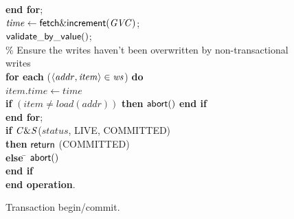\documentclass[11pt,letterpaper]{article}
\begin{document}
\begin{figure} [htb]
{{\begin{minipage}[t]{150mm}
\begin{tabbing}
 \> {\bf end for}; \\

 \> $\mathit{time} \gets {\sf fetch\&increment}(\mathit{GVC})$; \\

 \> ${\sf validate\_by\_value}()$;  \\


\> \% Ensure the writes haven't been overwritten by non-transactional writes \\
 \> 
{\bf for each} ($\left \langle \mathit{addr, item} \right \rangle  \in \mathit{ws}$) {\bf do} \\
 \>\> $\mathit{item.time} \gets \mathit{time}$ \\
 \>\> {\bf if} $(\mathit{item} \neq load(\mathit{addr}))$  
                 {\bf then}  
                   ${\sf abort}()$ 
                {\bf end if} \\

 \> {\bf end for}; \\
 \> {\bf if} ${\sf \mathit{C\&S}}$($\mathit{status}$, LIVE, COMMITTED) \\
 \>\> {\bf then} \> ${\sf return}$ (COMMITTED)\\
 \> \> {\bf else} \= ${\sf abort}()$ \\
 \> {\bf end if}  \\
{\bf end operation}.

\end{tabbing}
\normalsize
\end{minipage}
}
\caption{Transaction begin/commit.}
\label{fig:tbc}
}
\end{figure}
\end{document}
